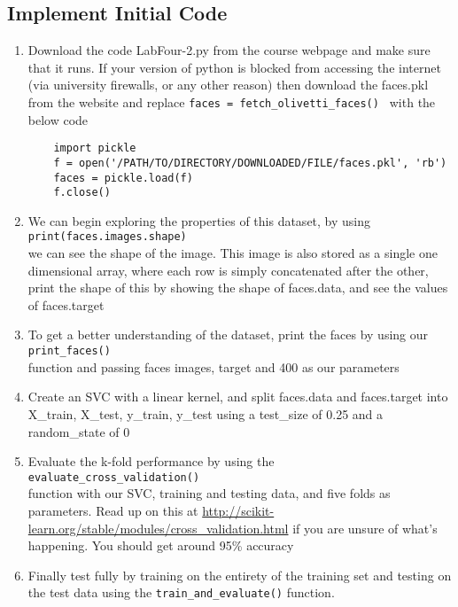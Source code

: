 \documentclass[12pt]{article}
\def\code#1{\texttt{#1}} %
\begin{document}
\subsection{Implement Initial Code}
\begin{enumerate}
\item Download the code LabFour-2.py from the course webpage and make sure that it runs. If your version of python is blocked from accessing the internet (via university firewalls, or any other reason) then download the faces.pkl from the website and replace \code{faces = fetch\_olivetti\_faces()
} with the below code 

\begin{verbatim}
    import pickle
    f = open('/PATH/TO/DIRECTORY/DOWNLOADED/FILE/faces.pkl', 'rb')
    faces = pickle.load(f)
    f.close()
\end{verbatim}

\item We can begin exploring the properties of this dataset, by using \\ \code{print(faces.images.shape)} \\ we can see the shape of the image. This image is also stored as a single one dimensional array, where each row is simply concatenated after the other, print the shape of this by showing the shape of faces.data, and see the values of faces.target 

\item To get a better understanding of the dataset, print the faces by using our \\ \code{print\_faces()} \\ function and passing faces images, target and 400 as our parameters
\item Create an SVC with a linear kernel, and split faces.data and faces.target into X\_train, X\_test, y\_train, y\_test using a test\_size of 0.25 and a random\_state of 0
\item Evaluate the k-fold performance by using the \\ \code{evaluate\_cross\_validation()} \\ function with our SVC, training and testing data, and five folds as parameters. Read up on this at \url{http://scikit-learn.org/stable/modules/cross_validation.html} if you are unsure of what's happening. You should get around 95\% accuracy
\item Finally test fully by training on the entirety of the training set and testing on the test data using the \code{train\_and\_evaluate()} function. 
\end{enumerate}
\end{document}
